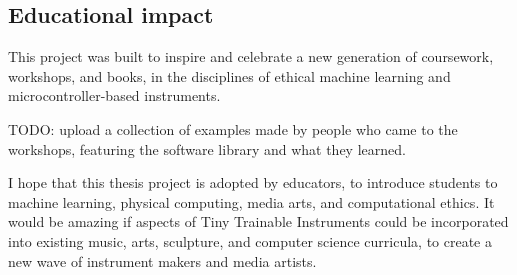 \subsection{Educational impact}

This project was built to inspire and celebrate a new generation of coursework, workshops, and books, in the disciplines of ethical machine learning and microcontroller-based instruments.

TODO: upload a collection of examples made by people who came to the workshops, featuring the software library and what they learned.

I hope that this thesis project is adopted by educators, to introduce students to machine learning, physical computing, media arts, and computational ethics. It would be amazing if aspects of Tiny Trainable Instruments could be incorporated into existing music, arts, sculpture, and computer science curricula, to create a new wave of instrument makers and media artists.
